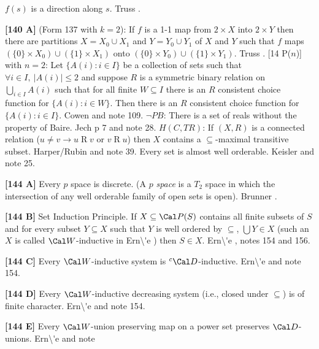 $f(s)$ is a direction along $s$.  \ac{Truss} \cite{1984}.
\smallskip
\item{}{\bf [140 A]}  (Form 137 with $k = 2$):  If $f$ is a 1-1
map from $2\times X$ into $2\times Y$ then there are partitions $X =
X_0 \cup X_1$ and $Y = Y_0 \cup Y_1$ of $X$ and $Y$
such that $f$ maps $(\{0\}\times X_0)\cup (\{1\}\times X_1)$ onto
$(\{0\}\times Y_0)\cup (\{1\}\times Y_1)$.  \ac{Truss} \cite{1984}.
\medskip
{} [14 P($n$)] with $n = 2$:  Let $\{A(i): i\in I\}$
be a collection of sets such that $\forall i\in I,\ |A(i)|\le 2$ and
suppose $R$ is a symmetric binary relation on $\bigcup^{}_{i\in I} A(i)$
such that for all finite $W\subseteq I$ there is an $R$ consistent choice
function for $\{A(i): i \in W\}$. Then there is an $R$ consistent choice
function for $\{A(i): i\in I\}$. \ac{Cowen} \cite{1977b} and note 109.
\medskip
{} $\neg  PB$:  There is a set of reals without the
property of Baire.  \ac{Jech} \cite{1973b} p 7 and note 28.
\medskip
{} $H(C,TR)$: If $(X,R)$ is a connected relation
($u\neq v\rightarrow u\mathrel R v$ or $v\mathrel R u$) then $X$ contains
a $\subseteq$-maximal transitive subset.  \ac{Harper/Rubin} \cite{1976}
and note 39.
\medskip
{} Every set is almost well orderable. \ac{Keisler}
\cite{1970} and note 25.
\smallskip
\item{}{\bf [144 A]}  Every $p$ space is discrete. (A $p$ {\it space} is a
$T_2$ space in which the intersection of any well orderable family
of open sets is open).  \ac{Brunner} \cite{1984c}.
\smallskip
\item{}{\bf [144 B]} Set Induction Principle.  If $X
\subseteq \Cal P(S)$ contains all finite subsets of $S$ and for
every subset $Y\subseteq X$ such that $Y$ is well ordered
by $\subseteq$, $\bigcup Y\in X$
(such an $X$ is called $\Cal W$-inductive in \ac{Ern\'e} \cite{2000})
then $S\in X$. \ac{Ern\'e} \cite{2000}, notes 154 and 156.
\smallskip
\item{}{\bf [144 C]} Every $\Cal W$-inductive system is $^c\Cal
D$-inductive.  \ac{Ern\'e} \cite{2000} and note 154.
\smallskip
\item{}{\bf [144 D]} Every $\Cal W$-inductive decreasing system
(i.e., closed under $\subseteq$) is of finite character.
\ac{Ern\'e} \cite{2000} and note 154.  
\smallskip
\item{}{\bf [144 E]} Every $\Cal W$-union preserving map on a
power set preserves $\Cal D$-unions. \ac{Ern\'e} \cite{2000} and note

